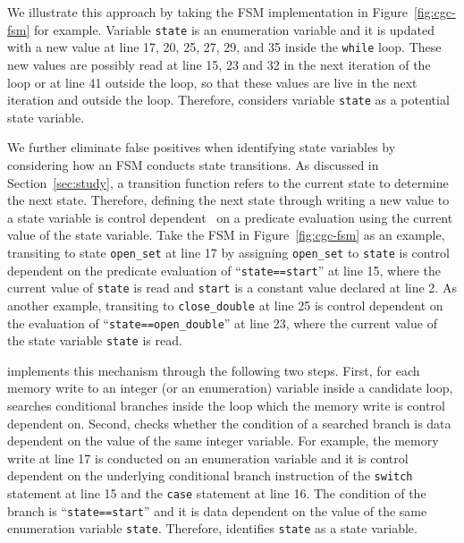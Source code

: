 We illustrate this approach by taking the FSM implementation
in Figure~\ref{fig:cgc-fsm} for example. 
Variable \texttt{state} is an enumeration variable and it is updated 
with a new value at 
line 17, 20, 25, 27, 29, and 35 inside the \texttt{while} loop. 
These new values are possibly read at line 15, 23 and 32 
in the next iteration of the loop or at line 41 outside the loop, 
so that these values are live in the next iteration and outside the loop. 
Therefore, \Tool{} considers variable \texttt{state} as a potential 
state variable.  



We further eliminate false positives when identifying state variables 
by considering how an FSM conducts state transitions. 
As discussed in Section~\ref{sec:study}, 
a transition function refers to the current state to determine the next state. 
Therefore, defining the next state through writing a new value to a state variable 
is control dependent~\cite{cdg} on a predicate evaluation 
using the current value of the state variable.  
Take the FSM in Figure~\ref{fig:cgc-fsm} as an example, 
transiting to state \texttt{open\_set} at line 17 by assigning 
\texttt{open\_set} to \texttt{state} 
is control dependent on the predicate evaluation 
of ``\texttt{state==start}'' at line 15,
where the current value of \texttt{state} is read 
and \texttt{start} is a constant value declared at line 2. 
As another example, transiting to \texttt{close\_double} at 
line 25 is control dependent on the 
evaluation of ``\texttt{state==open\_double}'' at line 23, 
where the current value of the state variable \texttt{state} is read. 



\Tool{} implements this mechanism through the following two steps. 
First, for each memory write to an integer (or an enumeration) 
variable inside a candidate loop, 
\Tool{} searches conditional branches inside the loop 
which the memory write is control dependent on. 
Second, \Tool{} checks whether the condition of a searched branch 
is data dependent on the value of the same integer variable. 
For example, the memory write at line 17 is conducted on an enumeration variable
and it is control dependent on the underlying conditional branch 
instruction of 
the \texttt{switch} statement at line 15 and the \texttt{case} statement at line 16.  
The condition of the branch is ``\texttt{state==start}'' and it is 
data dependent on the value of the same enumeration variable \texttt{state}. 
Therefore, \Tool{} identifies \texttt{state} as a state variable. 

